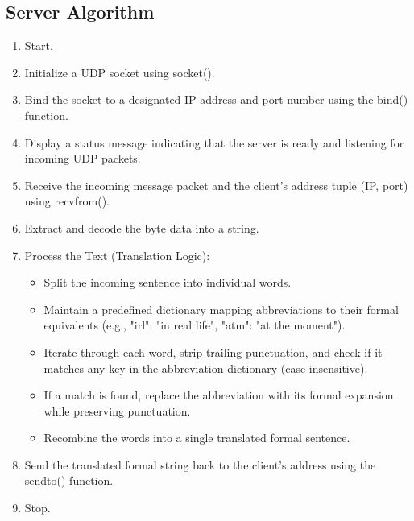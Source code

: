 \documentclass[12pt,a4paper]{article}
\begin{document}
	\subsection*{Server Algorithm}
	\begin{enumerate}
		\item Start.
		\item Initialize a UDP socket using socket().
		\item Bind the socket to a designated IP address and port number using the bind() function.
		\item Display a status message indicating that the server is ready and listening for incoming UDP packets.
			\item Receive the incoming message packet and the client's address tuple (IP, port) using recvfrom().
			\item Extract and decode the byte data into a string.
			\item Process the Text (Translation Logic):
			\begin{itemize}
				\item Split the incoming sentence into individual words.
				\item Maintain a predefined dictionary mapping abbreviations to their formal equivalents (e.g., "irl": "in real life", "atm": "at the moment").
				\item Iterate through each word, strip trailing punctuation, and check if it matches any key in the abbreviation dictionary (case-insensitive).
				\item If a match is found, replace the abbreviation with its formal expansion while preserving punctuation.
				\item Recombine the words into a single translated formal sentence.
			\end{itemize}
			\item Send the translated formal string back to the client's address using the sendto() function.
		\item Stop.
	\end{enumerate}
\end{document}
